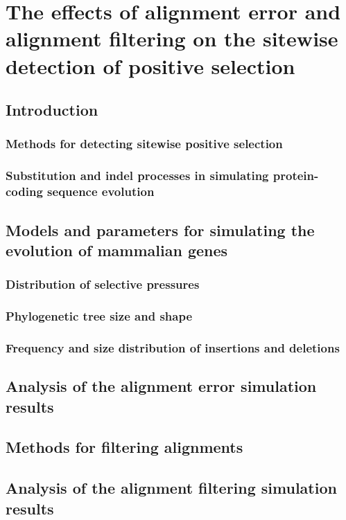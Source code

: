 \chapter{The effects of alignment error and alignment filtering on the sitewise detection of positive selection}

\section{Introduction}

\subsection{Methods for detecting sitewise positive selection}

\subsection{Substitution and indel processes in simulating protein-coding sequence evolution}

\section{Models and parameters for simulating the evolution of mammalian genes}

\subsection{Distribution of selective pressures}

\subsection{Phylogenetic tree size and shape}

\subsection{Frequency and size distribution of insertions and deletions}

\section{Analysis of the alignment error simulation results}

\section{Methods for filtering alignments}

\section{Analysis of the alignment filtering simulation results}
